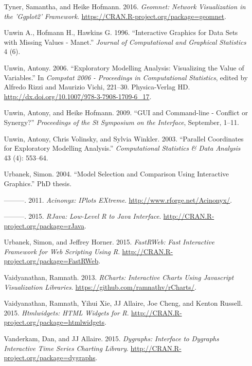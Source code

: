 \documentclass[12pt,]{isuthesis}
\begin{document}
\hypertarget{ref-geomnet}{}
Tyner, Samantha, and Heike Hofmann. 2016. \emph{Geomnet: Network
Visualization in the 'Ggplot2' Framework}.
\url{https://CRAN.R-project.org/package=geomnet}.

\hypertarget{ref-MANET}{}
Unwin A., Hofmann H., Hawkins G. 1996. ``Interactive Graphics for Data
Sets with Missing Values - Manet.'' \emph{Journal of Computational and
Graphical Statistics} 4 (6).

\hypertarget{ref-Unwin:2006}{}
Unwin, Antony. 2006. ``Exploratory Modelling Analysis: Visualizing the
Value of Variables.'' In \emph{Compstat 2006 - Proceedings in
Computational Statistics}, edited by Alfredo Rizzi and Maurizio Vichi,
221--30. Physica-Verlag HD.
\url{http://dx.doi.org/10.1007/978-3-7908-1709-6_17}.

\hypertarget{ref-Unwin:1999vp}{}
Unwin, Antony, and Heike Hofmann. 2009. ``GUI and Command-line -
Conflict or Synergy?'' \emph{Proceedings of the St Symposium on the
Interface}, September, 1--11.

\hypertarget{ref-Unwin:2003uy}{}
Unwin, Antony, Chris Volinsky, and Sylvia Winkler. 2003. ``Parallel
Coordinates for Exploratory Modelling Analysis.'' \emph{Computational
Statistics \& Data Analysis} 43 (4): 553--64.

\hypertarget{ref-Urbanek:2004}{}
Urbanek, Simon. 2004. ``Model Selection and Comparison Using Interactive
Graphics.'' PhD thesis.

\hypertarget{ref-iPlots}{}
---------. 2011. \emph{Acinonyx: IPlots EXtreme}.
\url{http://www.rforge.net/Acinonyx/}.

\hypertarget{ref-rJava}{}
---------. 2015. \emph{RJava: Low-Level R to Java Interface}.
\url{http://CRAN.R-project.org/package=rJava}.

\hypertarget{ref-FastRWeb}{}
Urbanek, Simon, and Jeffrey Horner. 2015. \emph{FastRWeb: Fast
Interactive Framework for Web Scripting Using R}.
\url{http://CRAN.R-project.org/package=FastRWeb}.

\hypertarget{ref-rCharts}{}
Vaidyanathan, Ramnath. 2013. \emph{RCharts: Interactive Charts Using
Javascript Visualization Libraries}.
\url{https://github.com/ramnathv/rCharts/}.

\hypertarget{ref-htmlwidgets}{}
Vaidyanathan, Ramnath, Yihui Xie, JJ Allaire, Joe Cheng, and Kenton
Russell. 2015. \emph{Htmlwidgets: HTML Widgets for R}.
\url{http://CRAN.R-project.org/package=htmlwidgets}.

\hypertarget{ref-dygraphs}{}
Vanderkam, Dan, and JJ Allaire. 2015. \emph{Dygraphs: Interface to
Dygraphs Interactive Time Series Charting Library}.
\url{http://CRAN.R-project.org/package=dygraphs}.
\end{document}
